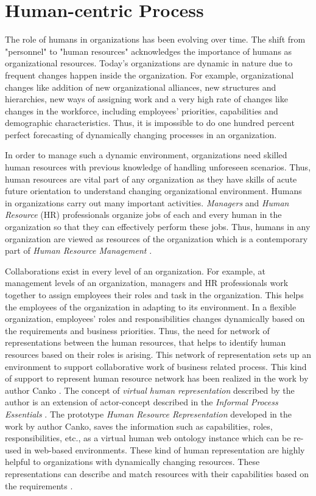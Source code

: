 \section{Human-centric Process}
\label{sec:humancentric}
The role of humans in organizations has been evolving over time. The shift from "personnel" to "human resources" acknowledges the importance of humans as organizational resources. Today's organizations are dynamic in nature due to frequent changes happen inside the organization. For example, organizational changes like addition of new organizational alliances, new structures and hierarchies, new ways of assigning work and a very high rate of changes like changes in the workforce, including employees' priorities, capabilities and demographic characteristics. Thus, it is impossible to do one hundred percent perfect forecasting of dynamically changing processes in an organization.

In order to manage such a dynamic environment, organizations need skilled human resources with previous knowledge of handling unforeseen scenarios. Thus, human resources are vital part of any organization as they have skills of acute future orientation to understand changing organizational environment. Humans in organizations carry out many important activities. \textit{Managers} and \textit{Human Resource} (HR) professionals organize jobs of each and every human in the organization so that they can effectively perform these jobs. Thus, humans in any organization are viewed as resources of the organization which is a contemporary part of \textit{Human Resource Management} \cite{Bianca2016}.

Collaborations exist in every level of an organization. For example, at management levels of an organization, managers and HR professionals work together to assign employees their roles and task in the organization. This helps the employees of the organization in adapting to its environment. In a flexible organization, employees' roles and responsibilities changes dynamically based on the requirements and business priorities. Thus, the need for network of representations between the human resources, that helps to identify human resources based on their roles is arising. This network of representation sets up an environment to support collaborative work of business related process. This kind of support to represent human resource network has been realized in the work by author Canko \cite{Canko2015}. The concept of \textit{virtual human representation} described by the author is an extension of actor-concept described in the \textit{Informal Process Essentials} \cite{Sungur2014a}. The prototype \textit{Human Resource Representation} developed in the work by author Canko, saves the information such as capabilities, roles, responsibilities, etc., as a virtual human web ontology instance which can be re-used in web-based environments. These kind of human representation are highly helpful to organizations with dynamically changing resources. These representations can describe and match resources with their capabilities based on the requirements \cite{Canko2015}.

